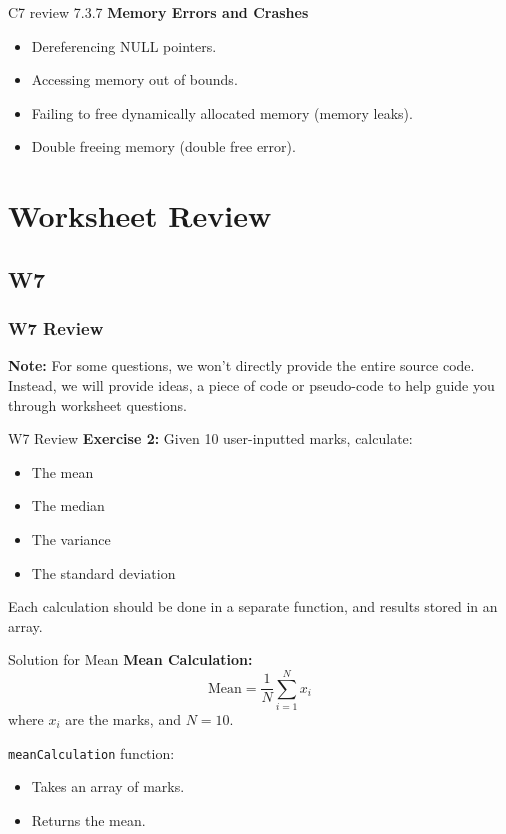 \documentclass[
	11pt, %
]{beamer}
\begin{document}
\begin{frame}{C7 review 7.3.7}
    \textbf{Memory Errors and Crashes}
    \begin{itemize}
        \item Dereferencing NULL pointers.
        \item Accessing memory out of bounds.
        \item Failing to free dynamically allocated memory (memory leaks).
        \item Double freeing memory (double free error).
    \end{itemize}
\end{frame}



\section{Worksheet Review}

\subsection{W7} 
\frametitle{W7 Review}
\begin{frame}
	\textbf{Note:} For some questions, we won't directly provide the entire source code.
    Instead, we will provide ideas, a piece of code or pseudo-code to help guide you through worksheet questions.
\end{frame}

\begin{frame}{W7 Review}
    \textbf{Exercise 2:} Given 10 user-inputted marks, calculate:
    \begin{itemize}
        \item The mean
        \item The median
        \item The variance
        \item The standard deviation
    \end{itemize}
    Each calculation should be done in a separate function, and results stored in an array.
\end{frame}

\begin{frame}{Solution for Mean}
    \textbf{Mean Calculation:}
    \[
    \text{Mean} = \frac{1}{N} \sum_{i=1}^N x_i
    \]
    where \( x_i \) are the marks, and \( N = 10 \).
    
    \texttt{meanCalculation} function:
    \begin{itemize}
        \item Takes an array of marks.
        \item Returns the mean.
    \end{itemize}
\end{frame}
\end{document}
